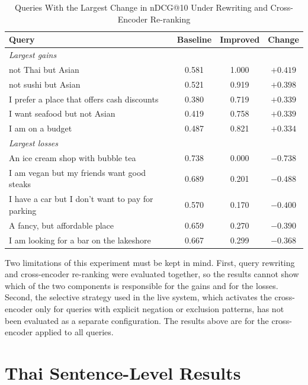 \begin{table}[htbp]
\centering
\caption{Queries With the Largest Change in nDCG@10 Under Rewriting and Cross-Encoder Re-ranking}
\label{tab:b3queries}
\footnotesize
\begin{tabular}{|p{}|c|c|c|}
\hline
\textbf{Query} & \textbf{Baseline} & \textbf{Improved} & \textbf{Change} \\
\hline
\multicolumn{4}{|l|}{\textit{Largest gains}} \\
\hline
not Thai but Asian & 0.581 & 1.000 & $+0.419$ \\
\hline
not sushi but Asian & 0.521 & 0.919 & $+0.398$ \\
\hline
I prefer a place that offers cash discounts & 0.380 & 0.719 & $+0.339$ \\
\hline
I want seafood but not Asian & 0.419 & 0.758 & $+0.339$ \\
\hline
I am on a budget & 0.487 & 0.821 & $+0.334$ \\
\hline
\multicolumn{4}{|l|}{\textit{Largest losses}} \\
\hline
An ice cream shop with bubble tea & 0.738 & 0.000 & $-0.738$ \\
\hline
I am vegan but my friends want good steaks & 0.689 & 0.201 & $-0.488$ \\
\hline
I have a car but I don't want to pay for parking & 0.570 & 0.170 & $-0.400$ \\
\hline
A fancy, but affordable place & 0.659 & 0.270 & $-0.390$ \\
\hline
I am looking for a bar on the lakeshore & 0.667 & 0.299 & $-0.368$ \\
\hline
\end{tabular}
\end{table}

Two limitations of this experiment must be kept in mind. First, query rewriting and cross-encoder re-ranking were evaluated together, so the results cannot show which of the two components is responsible for the gains and for the losses. Second, the selective strategy used in the live system, which activates the cross-encoder only for queries with explicit negation or exclusion patterns, has not been evaluated as a separate configuration. The results above are for the cross-encoder applied to all queries.

\section{Thai Sentence-Level Results}
\label{sec:resthai}

